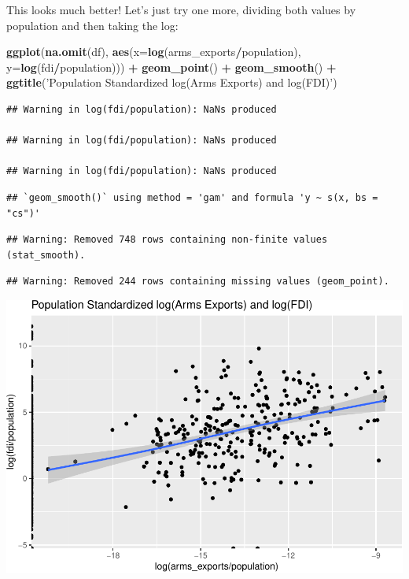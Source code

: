 \documentclass[12pt,]{article}
\newenvironment{Shaded}{\begin{snugshade}}{\end{snugshade}}
\newcommand{\DataTypeTok}[1]{\textcolor[rgb]{0.13,0.29,0.53}{#1}}
\newcommand{\KeywordTok}[1]{\textcolor[rgb]{0.13,0.29,0.53}{\textbf{#1}}}
\newcommand{\NormalTok}[1]{#1}
\newcommand{\OperatorTok}[1]{\textcolor[rgb]{0.81,0.36,0.00}{\textbf{#1}}}
\newcommand{\StringTok}[1]{\textcolor[rgb]{0.31,0.60,0.02}{#1}}
\begin{document}
This looks much better! Let's just try one more, dividing both values by
population and then taking the log:

\begin{Shaded}
\begin{Highlighting}[]
\KeywordTok{ggplot}\NormalTok{(}\KeywordTok{na.omit}\NormalTok{(df), }\KeywordTok{aes}\NormalTok{(}\DataTypeTok{x=}\KeywordTok{log}\NormalTok{(arms_exports}\OperatorTok{/}\NormalTok{population), }\DataTypeTok{y=}\KeywordTok{log}\NormalTok{(fdi}\OperatorTok{/}\NormalTok{population))) }\OperatorTok{+}\StringTok{ }
\StringTok{    }\KeywordTok{geom_point}\NormalTok{() }\OperatorTok{+}
\StringTok{    }\KeywordTok{geom_smooth}\NormalTok{() }\OperatorTok{+}
\StringTok{    }\KeywordTok{ggtitle}\NormalTok{(}\StringTok{'Population Standardized log(Arms Exports) and log(FDI)'}\NormalTok{)}
\end{Highlighting}
\end{Shaded}

\begin{verbatim}
## Warning in log(fdi/population): NaNs produced

## Warning in log(fdi/population): NaNs produced

## Warning in log(fdi/population): NaNs produced
\end{verbatim}

\begin{verbatim}
## `geom_smooth()` using method = 'gam' and formula 'y ~ s(x, bs = "cs")'
\end{verbatim}

\begin{verbatim}
## Warning: Removed 748 rows containing non-finite values (stat_smooth).
\end{verbatim}

\begin{verbatim}
## Warning: Removed 244 rows containing missing values (geom_point).
\end{verbatim}

\includegraphics{proposal_files/figure-latex/unnamed-chunk-23-1.pdf}
\end{document}
